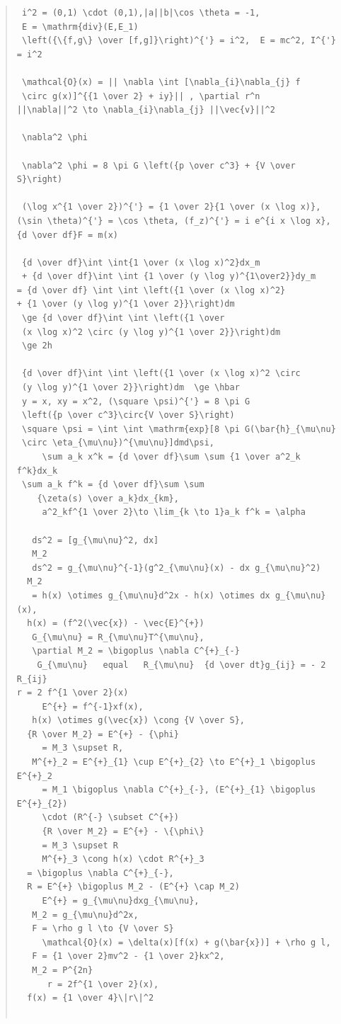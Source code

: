 \documentclass{jsarticle}
\begin{document}
\begin{quote}
\begin{verbatim}
 i^2 = (0,1) \cdot (0,1),|a||b|\cos \theta = -1, 
 E = \mathrm{div}(E,E_1) 
 \left({\{f,g\} \over [f,g]}\right)^{'} = i^2,  E = mc^2, I^{'} = i^2 

 \mathcal{O}(x) = || \nabla \int [\nabla_{i}\nabla_{j} f 
 \circ g(x)]^{{1 \over 2} + iy}|| , \partial r^n 
||\nabla||^2 \to \nabla_{i}\nabla_{j} ||\vec{v}||^2 

 \nabla^2 \phi 

 \nabla^2 \phi = 8 \pi G \left({p \over c^3} + {V \over S}\right) 

 (\log x^{1 \over 2})^{'} = {1 \over 2}{1 \over (x \log x)},
(\sin \theta)^{'} = \cos \theta, (f_z)^{'} = i e^{i x \log x}, 
{d \over df}F = m(x) 

 {d \over df}\int \int{1 \over (x \log x)^2}dx_m 
 + {d \over df}\int \int {1 \over (y \log y)^{1\over2}}dy_m
= {d \over df} \int \int \left({1 \over (x \log x)^2} 
+ {1 \over (y \log y)^{1 \over 2}}\right)dm  
 \ge {d \over df}\int \int \left({1 \over 
 (x \log x)^2 \circ (y \log y)^{1 \over 2}}\right)dm 
 \ge 2h

 {d \over df}\int \int \left({1 \over (x \log x)^2 \circ 
 (y \log y)^{1 \over 2}}\right)dm  \ge \hbar 
 y = x, xy = x^2, (\square \psi)^{'} = 8 \pi G
 \left({p \over c^3}\circ{V \over S}\right) 
 \square \psi = \int \int \mathrm{exp}[8 \pi G(\bar{h}_{\mu\nu}
 \circ \eta_{\mu\nu})^{\mu\nu}]dmd\psi,
	 \sum a_k x^k = {d \over df}\sum \sum {1 \over a^2_k f^k}dx_k
 \sum a_k f^k = {d \over df}\sum \sum
	{\zeta(s) \over a_k}dx_{km}, 
	 a^2_kf^{1 \over 2}\to \lim_{k \to 1}a_k f^k = \alpha 

   ds^2 = [g_{\mu\nu}^2, dx] 
   M_2 
   ds^2 = g_{\mu\nu}^{-1}(g^2_{\mu\nu}(x) - dx g_{\mu\nu}^2) 
  M_2  
   = h(x) \otimes g_{\mu\nu}d^2x - h(x) \otimes dx g_{\mu\nu}(x),
  h(x) = (f^2(\vec{x}) - \vec{E}^{+}) 
   G_{\mu\nu} = R_{\mu\nu}T^{\mu\nu},
   \partial M_2 = \bigoplus \nabla C^{+}_{-}   
    G_{\mu\nu}   equal   R_{\mu\nu}  {d \over dt}g_{ij} = - 2 R_{ij} 
r = 2 f^{1 \over 2}(x)
     E^{+} = f^{-1}xf(x), 
   h(x) \otimes g(\vec{x}) \cong {V \over S},
  {R \over M_2} = E^{+} - {\phi}   
     = M_3 \supset R,
   M^{+}_2 = E^{+}_{1} \cup E^{+}_{2} \to E^{+}_1 \bigoplus E^{+}_2   
     = M_1 \bigoplus \nabla C^{+}_{-}, (E^{+}_{1} \bigoplus E^{+}_{2}) 
     \cdot (R^{-} \subset C^{+})   
     {R \over M_2} = E^{+} - \{\phi\}   
     = M_3 \supset R   
     M^{+}_3 \cong h(x) \cdot R^{+}_3
  = \bigoplus \nabla C^{+}_{-}, 
  R = E^{+} \bigoplus M_2 - (E^{+} \cap M_2)   
     E^{+} = g_{\mu\nu}dxg_{\mu\nu},
   M_2 = g_{\mu\nu}d^2x,
   F = \rho g l \to {V \over S}   
     \mathcal{O}(x) = \delta(x)[f(x) + g(\bar{x})] + \rho g l,
   F = {1 \over 2}mv^2 - {1 \over 2}kx^2,
   M_2 = P^{2n}   
      r = 2f^{1 \over 2}(x),
  f(x) = {1 \over 4}\|r\|^2   


\end{verbatim}
\end{quote}
\end{document}
